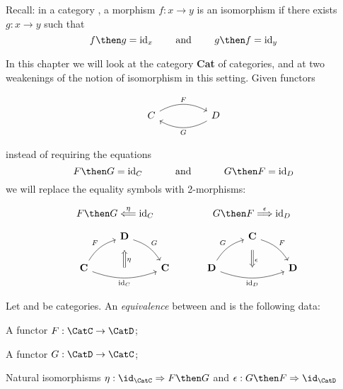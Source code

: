 
Recall: in a category \CatC, a morphism $f: x \rightarrow y$ is an isomorphism if there exists $g : x \rightarrow y$ such that
\[
  f \then g = \text{id}_x \quad \quad \text{ and } \quad \quad g \then f = \text{id}_y
\]


In this chapter we will look at the category \textbf{Cat} of categories, and at two weakenings of the notion of isomorphism in this setting.
Given functors

\[\begin{tikzcd}
    C && D
    \arrow["F", bend left=30, from=1-1, to=1-3]
    \arrow["G", bend left=30, from=1-3, to=1-1]
\end{tikzcd}\]

instead of requiring the equations
\[
  F \then G = \text{id}_C  \quad \quad \quad  \text{ and } \quad \quad \quad G \then F = \text{id}_D
\]
we will replace the equality symbols with 2-morphisms:
\

\[
  F \then G \overset{\eta}{\Longleftarrow} \text{id}_C  \quad \quad \quad \quad \quad \quad G \then F \overset{\epsilon}{\Longrightarrow} \text{id}_D
\]


\[
  \quad
  \begin{tikzcd}
    & {\mathbf{D}} \\
    {\mathbf{C}} && {\mathbf{C}}
    \arrow["F", bend left=20, from=2-1, to=1-2]
    \arrow["G", bend left=20, from=1-2, to=2-3]
    \arrow[""{name=0, anchor=center, inner sep=0}, "{\text{id}_C}"', bend right=20, from=2-1, to=2-3]
    \arrow["\eta", shorten <=7pt, shorten >=10pt, Leftarrow, from=1-2, to=0]
  \end{tikzcd}
  \quad \quad \quad
  \begin{tikzcd}
    & {\mathbf{C}} \\
    {\mathbf{D}} && {\mathbf{D}}
    \arrow["G", bend left=20, from=2-1, to=1-2]
    \arrow["F", bend left=20, from=1-2, to=2-3]
    \arrow[""{name=0, anchor=center, inner sep=0}, "{\text{id}_D}"', bend right=20, from=2-1, to=2-3]
    \arrow["\epsilon", shorten <=7pt, shorten >=10pt, Rightarrow, from=1-2, to=0]
  \end{tikzcd}
\]

\begin{ctdefinition}[]
  \label{def:cat-equivalence}
  Let \CatC and \CatD be categories. An \emph{equivalence} between \CatC and \CatD is the following data:
  \begin{compactenum}
    \item A functor $F:  \CatC \rightarrow \CatD$;
    \item A functor $G: \CatD \rightarrow \CatC $;
    \item Natural isomorphisms $\eta : \id_\CatC \Rightarrow F \then G$ and $\epsilon : G \then F \Rightarrow \id_\CatD$
  \end{compactenum}
\end{ctdefinition}


